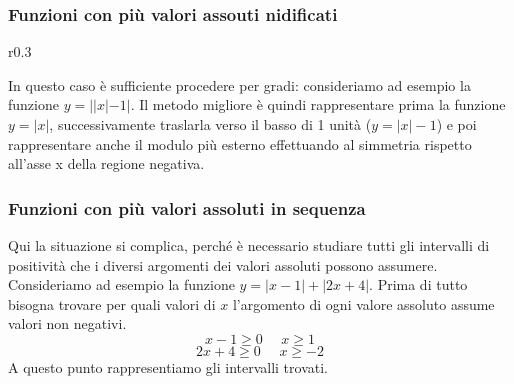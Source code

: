 \documentclass{article}     %
\begin{document}
    \subsubsection{Funzioni con più valori assouti nidificati}
    \begin{wrapfigure}{r}{0.3\textwidth}
        \centering
    \end{wrapfigure}
        In questo caso è sufficiente procedere per gradi: consideriamo ad esempio la funzione $y=||x|-1|$. Il metodo migliore è quindi rappresentare prima la funzione $y=|x|$, successivamente traslarla verso il basso di 1 unità ($y=|x|-1$) e poi rappresentare anche il modulo più esterno effettuando al simmetria rispetto all'asse x della regione negativa. 
    \subsubsection{Funzioni con più valori assoluti in sequenza}
        Qui la situazione si complica, perché è necessario studiare tutti gli intervalli di positività che i diversi argomenti dei valori assoluti possono assumere. Consideriamo ad esempio la funzione $y=|x-1|+|2x+4|$.
        Prima di tutto bisogna trovare per quali valori di $x$ l'argomento di ogni valore assoluto assume valori non negativi.
        \[x-1\geq0 ~~~~~~x\geq 1\]
        \[2x+4\geq0~~~~~~x\geq -2 \]
        A questo punto rappresentiamo gli intervalli trovati.
        
\end{document}
